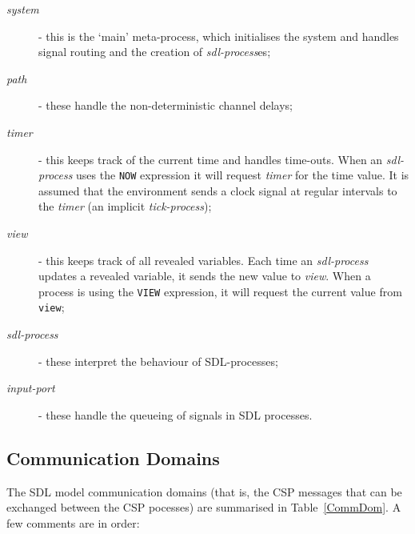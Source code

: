 \begin{description}
\item [{\em system}] - this is the `main' meta-process, which
initialises the system and handles signal routing and the creation 
of {\em sdl-process}es;
\item [{\em path}] - these handle the non-deterministic channel
delays;
\item [{\em timer}] - this keeps track of the current time and 
handles time-outs. When an {\em sdl-process} uses the {\tt NOW} 
expression it will request {\em timer} for the time value. 
It is assumed that the environment sends a clock signal at regular
intervals to the {\em timer} (an implicit {\em tick-process});
\item [{\em view}] - this keeps track of all revealed variables.
Each time an {\em sdl-process} updates a revealed variable, it 
sends the new value to {\em view}. When a process is using the 
{\tt VIEW} expression, it will request the current value from {\tt
view};
\item [{\em sdl-process}] - these interpret the behaviour of
SDL-processes;
\item [{\em input-port}] - these handle the queueing of signals 
in SDL processes.
\end{description}

\subsection{Communication Domains}

The SDL model communication domains (that is, the CSP messages that
can be exchanged between the CSP pocesses) are summarised in
Table~\ref{CommDom}. 
A few comments are in order:


